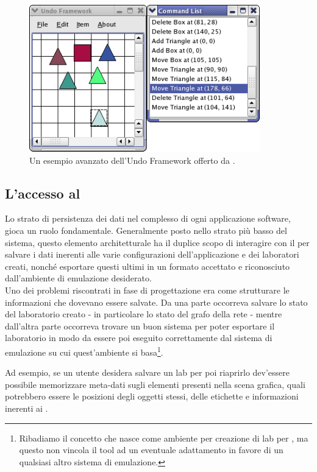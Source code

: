 \begin{figure}[!htb]
	\centering
	\includegraphics[width=10cm]{images/undoframeworkexample.png}
	\caption{Un esempio avanzato dell'Undo Framework offerto da \qt{}.}
	\label{figura:qt_undo}
\end{figure}

\subsection{L'accesso al \fs{}}
Lo strato di persistenza dei dati nel complesso di ogni applicazione software, gioca un ruolo fondamentale. Generalmente posto nello strato più basso del sistema, questo elemento architetturale ha il duplice scopo di interagire con il \fs{} per salvare i dati inerenti alle varie configurazioni dell'applicazione e dei laboratori creati, nonché esportare questi ultimi in un formato accettato e riconosciuto dall'ambiente di emulazione desiderato.\\
Uno dei problemi riscontrati in fase di progettazione era come strutturare le informazioni che dovevano essere salvate. Da una parte occorreva salvare lo stato del laboratorio creato - in particolare lo stato del grafo della rete - mentre dall'altra parte occorreva trovare un buon sistema per poter esportare il laboratorio in modo da essere poi eseguito correttamente dal sistema di emulazione su cui quest'ambiente si basa\footnote{Ribadiamo il concetto che \visualnetkit{} nasce come ambiente per creazione di lab per \netkit{}, ma questo non vincola il tool ad un eventuale adattamento in favore di un qualsiasi altro sistema di emulazione.}.

Ad esempio, se un utente desidera salvare un lab per poi riaprirlo dev'essere possibile memorizzare meta-dati sugli elementi presenti nella scena grafica, quali potrebbero essere le posizioni degli oggetti stessi, delle etichette e informazioni inerenti ai \plugin{}.


